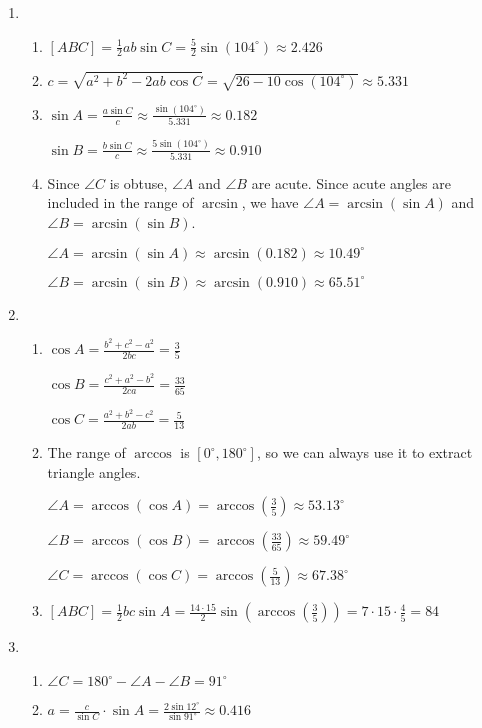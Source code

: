 \begin{enumerate}
\item \begin{enumerate}
\item $[ABC] = \frac{1}{2}ab\sin C = \frac{5}{2}\sin(104^{\circ})\approx 2.426$
\item $c = \sqrt{a^2 + b^2 - 2ab\cos C} = \sqrt{26 - 10\cos(104^{\circ})}\approx 5.331$
\item $\sin A = \frac{a\sin C}{c}\approx\frac{\sin(104^{\circ})}{5.331}\approx 0.182$\par
$\sin B = \frac{b\sin C}{c}\approx\frac{5\sin(104^{\circ})}{5.331}\approx 0.910$
\item Since $\angle C$ is obtuse, $\angle A$ and $\angle B$ are acute. Since acute angles are included in the range of $\arcsin$, we have $\angle A = \arcsin(\sin A)$ and $\angle B = \arcsin(\sin B)$.\par
$\angle A = \arcsin(\sin A)\approx\arcsin(0.182)\approx 10.49^{\circ}$\par 
$\angle B = \arcsin(\sin B)\approx\arcsin(0.910)\approx 65.51^{\circ}$
\end{enumerate}
\item \begin{enumerate}
\item $\cos A = \frac{b^2 + c^2 - a^2}{2bc} = \frac{3}{5}$\par
$\cos B = \frac{c^2 + a^2 - b^2}{2ca} = \frac{33}{65}$\par
$\cos C = \frac{a^2 + b^2 - c^2}{2ab} = \frac{5}{13}$
\item The range of $\arccos$ is $[0^{\circ}, 180^{\circ}]$, so we can always use it to extract triangle angles.\par
$\angle A = \arccos(\cos A) = \arccos(\frac{3}{5})\approx 53.13^{\circ}$\par
$\angle B = \arccos(\cos B) = \arccos(\frac{33}{65})\approx 59.49^{\circ}$\par
$\angle C = \arccos(\cos C) = \arccos(\frac{5}{13})\approx 67.38^{\circ}$
\item $[ABC] = \frac{1}{2}bc\sin A = \frac{14\cdot 15}{2}\sin(\arccos(\frac{3}{5})) = 7\cdot 15\cdot\frac{4}{5} = 84$
\end{enumerate}
\item \begin{enumerate}
\item $\angle C = 180^{\circ} - \angle A - \angle B = 91^{\circ}$
\item $a = \frac{c}{\sin C}\cdot\sin A = \frac{2\sin 12^{\circ}}{\sin 91^{\circ}}\approx 0.416$\par

\end{enumerate}
\end{enumerate}
